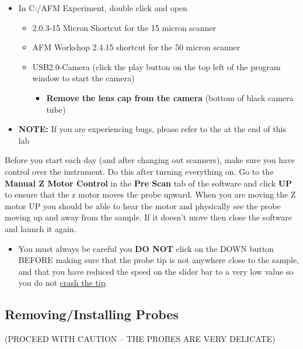 \documentclass{../lab}
\begin{document}
\begin{itemize}
    \item In C:/AFM Experiment, double click and open
    \begin{itemize}
        \item 2.0.3-15 Micron Shortcut for the 15 micron scanner

        \item AFM Workshop 2.4.15 shortcut for the 50 micron scanner

        \item USB2.0-Camera (click the play button on the top left of the program window to start the camera)

        \begin{itemize}
            \item \textbf{Remove the lens cap from the camera }(bottom of black camera tube)

        \end{itemize}

    \end{itemize}

    \item \textbf{NOTE:} If you are experiencing bugs, please refer to the \textbf{} at the end of this lab

\end{itemize}

Before you start each day (and after changing out scanners), make sure you have control over the instrument. Do this after turning everything on. Go to the \textbf{Manual Z Motor Control} in the \textbf{Pre Scan} tab of the software and click \textbf{UP} to ensure that the z motor moves the probe upward.  When you are moving the Z motor UP you should be able to hear the motor and physically see the probe moving up and away from the sample.  If it doesn’t move then close the software and launch it again.

\begin{itemize}
    \item You must always be careful you \textbf{DO NOT} click on the DOWN button BEFORE making sure that the probe tip is not anywhere close to the sample, and that you have reduced the speed on the slider bar to a very low value so you do not \hyperref[subsec:BrokenTip]{crash the tip}.

\end{itemize}

\subsection{Removing/Installing Probes} (PROCEED WITH CAUTION -- THE PROBES ARE VERY DELICATE)
\end{document}
